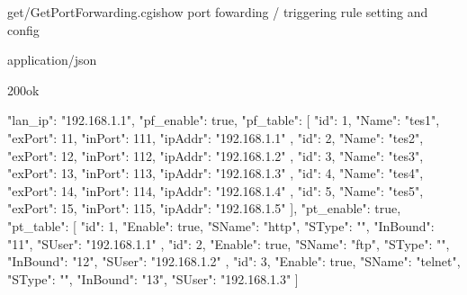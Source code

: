 \documentclass[12pt,a4paper]{article}
\begin{document}
\begin{apiRoute}{get}{/GetPortForwarding.cgi}{show port fowarding / triggering rule setting and config}
	
	\begin{routeParameter}
	
	\end{routeParameter}
	\begin{routeResponse}{application/json}
		\begin{routeResponseItem}{200}{ok}
			\begin{routeResponseItemBody}
{
  "lan_ip": "192.168.1.1",
  "pf_enable": true,
  "pf_table": [
    {
      "id": 1,
      "Name": "tes1",
      "exPort": 11,
      "inPort": 111,
      "ipAddr": "192.168.1.1"
    },
    {
      "id": 2,
      "Name": "tes2",
      "exPort": 12,
      "inPort": 112,
      "ipAddr": "192.168.1.2"
    },
    {
      "id": 3,
      "Name": "tes3",
      "exPort": 13,
      "inPort": 113,
      "ipAddr": "192.168.1.3"
    },
    {
      "id": 4,
      "Name": "tes4",
      "exPort": 14,
      "inPort": 114,
      "ipAddr": "192.168.1.4"
    },
    {
      "id": 5,
      "Name": "tes5",
      "exPort": 15,
      "inPort": 115,
      "ipAddr": "192.168.1.5"
    }
  ],
  "pt_enable": true,
  "pt_table": [
    {
      "id": 1,
      "Enable": true,
      "SName": "http",
      "SType": "",
      "InBound": "11",
      "SUser": "192.168.1.1"
    },
    {
      "id": 2,
      "Enable": true,
      "SName": "ftp",
      "SType": "",
      "InBound": "12",
      "SUser": "192.168.1.2"
    },
    {
      "id": 3,
      "Enable": true,
      "SName": "telnet",
      "SType": "",
      "InBound": "13",
      "SUser": "192.168.1.3"
    }
  ]
}
			\end{routeResponseItemBody}
		\end{routeResponseItem}
	\end{routeResponse}
	
\end{apiRoute}
\end{document}
